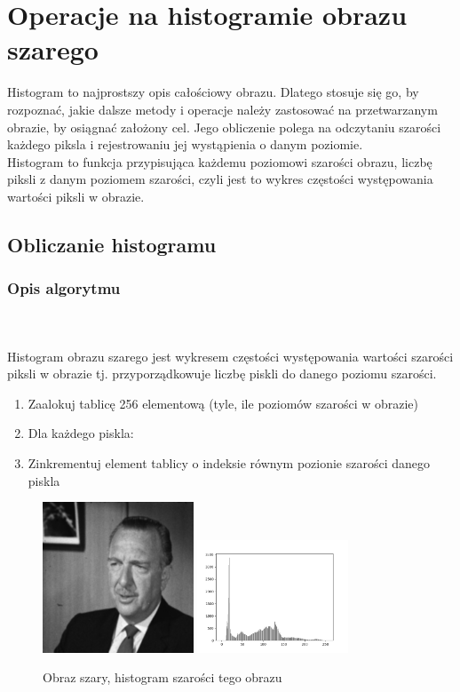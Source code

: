 \documentclass[final,a4paper,openany,12pt]{mwbk}
\begin{document}
\chapter{Operacje na histogramie obrazu szarego}
Histogram to najprostszy opis całościowy obrazu. Dlatego stosuje się go, by rozpoznać, jakie dalsze metody i operacje należy zastosować na przetwarzanym obrazie, by osiągnać założony cel. Jego obliczenie polega na odczytaniu szarości każdego piksla i rejestrowaniu jej wystąpienia o danym poziomie.\\
Histogram to funkcja przypisująca każdemu poziomowi szarości obrazu, liczbę piksli z danym poziomem szarości, czyli jest to wykres częstości występowania wartości piksli w obrazie.
\newpage


\section{Obliczanie histogramu}
\subsection*{Opis algorytmu}
\hfill
\\\\
\indent 
Histogram obrazu szarego jest wykresem częstości występowania wartości szarości piksli w obrazie tj.
przyporządkowuje liczbę piskli do danego poziomu szarości.\newline
\begin{enumerate}
	\item Zaalokuj tablicę 256 elementową (tyle, ile poziomów szarości w obrazie)
	\item Dla każdego piskla:
	\item Zinkrementuj element tablicy o indeksie równym pozionie szarości danego piskla
\end{enumerate}

\begin{figure}[H]
	\begin{center}
		\includegraphics[width=0.4\textwidth]{gentelman_gray}
		\includegraphics[width=0.4\textwidth]{gentelman_gray_histogram}
	\end{center}
	\caption{Obraz szary, histogram szarości tego obrazu}
\end{figure}
\end{document}
